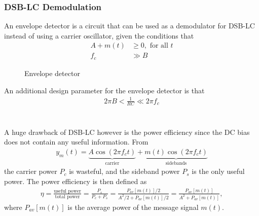 \documentclass{report}
\begin{document}
\subsubsection{DSB-LC Demodulation}
An envelope detector is a circuit that can be used as a demodulator for DSB-LC instead of using a carrier oscillator, given the conditions that 
\begin{align}
    A + m(t) &\geq 0, \text{ for all } t \\
    f_c &\gg B
\end{align}
\begin{figure}[!hbt]
    \centering
    \caption{Envelope detector}
\end{figure}

An additional design parameter for the envelope detector is that 
\begin{align}
    2\pi B < \frac{1}{RC} \ll 2\pi f_c
\end{align}
\\ \\
A huge drawback of DSB-LC however is the power efficiency since the DC bias does not contain any 
useful information. From
\begin{align}
    y_m(t) = \underbrace{A\cos(2\pi f_c t)}_{\text{carrier}} + \underbrace{m(t)\cos(2\pi f_c t)}_{\text{sidebands}}
\end{align}
the carrier power $P_c$ is wasteful, and the sideband power $P_s$ is the only useful power. The power efficiency is then defined as 
\begin{align}
    \eta = \frac{\text{useful power}}{\text{total power}} = \frac{P_s}{P_c + P_s} = \frac{P_{av}[m(t)]/2}{A^2/2 + P_{av}[m(t)]/2} = \frac{P_{av}[m(t)]}{A^2 + P_{av}[m(t)]},
\end{align}
where $P_{av}[m(t)]$ is the average power of the message signal $m(t)$.
\end{document}
